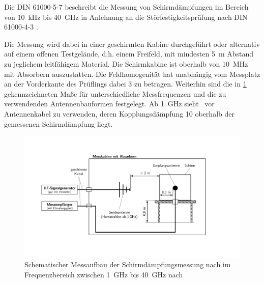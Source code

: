 Die DIN 61000-5-7 \cite{DIN_EN_61000-5-7} beschreibt die Messung von Schirmdämpfungen im Bereich von \SI{10}{\kilo\hertz} bis \SI{40}{\giga\hertz} in Anlehnung an die Störfestigkeitsprüfung nach DIN 61000-4-3 \cite{DIN_EN_61000-4-3}.
\par
\vspace{\linespace}
Die Messung wird dabei in einer geschirmten Kabine durchgeführt oder alternativ auf einem offenen Testgelände, d.h. einem Freifeld, mit mindesten \SI{5}{\meter} Abstand zu jeglichem leitfähigem Material. Die Schirmkabine ist oberhalb von \SI{10}{\mega\hertz} mit Absorbern auszustatten. Die Feldhomogenität hat unabhängig vom Messplatz an der Vorderkante des Prüflings dabei \SI{3}{\Dezibel} zu betragen. Weiterhin sind die in \Abb\ref{fig:2_Schematik_Schirmdaempfungsmessung_DIN_61000-5-7} gekennzeichneten Maße für unterschiedliche Messfrequenzen und die zu verwendenden Antennenbauformen festgelegt. Ab \SI{1}{\giga\hertz} sieht~\cite{DIN_EN_61000-5-7} vor Antennenkabel zu verwenden, deren Kopplungsdämpfung \SI{10}{\Dezibel} oberhalb der gemessenen Schirmdämpfung liegt.
\par
\vspace{\linespace}


\begin{figure}[ht]
    \centering
    \includegraphics[page = 1, trim = 2cm 3cm 5cm 3cm, clip, width=.9\textwidth]{Abbildungen/Kapitel2/Schematiken_Schirmdaempfungsmessung.pdf}
    \caption[Schematischer Messaufbau der Schirmdämpfungsmessung nach \citeauthor{DIN_EN_61000-5-7} im Frequenzbereich zwischen \SI{1}{\giga\hertz} bis \SI{40}{\giga\hertz}]{Schematischer Messaufbau der Schirmdämpfungsmessung nach \citeauthor{DIN_EN_61000-5-7} im Frequenzbereich zwischen \SI{1}{\giga\hertz} bis \SI{40}{\giga\hertz} nach~\cite{DIN_EN_61000-5-7}}
    \label{fig:2_Schematik_Schirmdaempfungsmessung_DIN_61000-5-7}
\end{figure}


